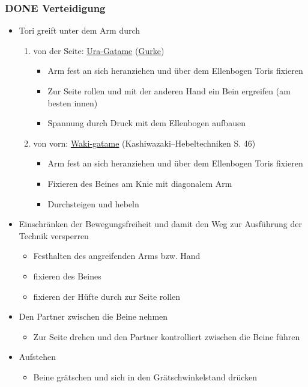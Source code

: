\documentclass[11pt]{article}
\begin{document}
\subsubsection{{\bfseries\sffamily DONE} Verteidigung}
\label{sec:org4b89ba2}
\begin{itemize}
\item Tori greift unter dem Arm durch
\begin{enumerate}
\item von der Seite: \hyperref[orgac6ca0d]{Ura-Gatame} (\hyperref[org68a906c]{Gurke})
\begin{itemize}
\item Arm fest an sich heranziehen und über dem Ellenbogen Toris fixieren
\item Zur Seite rollen und mit der anderen Hand ein Bein ergreifen (am besten innen)
\item Spannung durch Druck mit dem Ellenbogen aufbauen
\end{itemize}
\item von vorn: \hyperref[org78b6927]{Waki-gatame} (Kashiwazaki--Hebeltechniken S. 46)
\begin{itemize}
\item Arm fest an sich heranziehen und über dem Ellenbogen Toris fixieren
\item Fixieren des Beines am Knie mit diagonalem Arm
\item Durchsteigen und hebeln
\end{itemize}
\end{enumerate}
\item Einschränken der Bewegungsfreiheit und damit den Weg zur Ausführung der Technik versperren
\begin{itemize}
\item Festhalten des angreifenden Arms bzw. Hand
\item fixieren des Beines
\item fixieren der Hüfte durch zur Seite rollen
\end{itemize}
\item Den Partner zwischen die Beine nehmen
\begin{itemize}
\item Zur Seite drehen und den Partner kontrolliert zwischen die Beine führen
\end{itemize}
\item Aufstehen
\begin{itemize}
\item Beine grätschen und sich in den Grätschwinkelstand drücken
\end{itemize}
\end{itemize}
\end{document}
